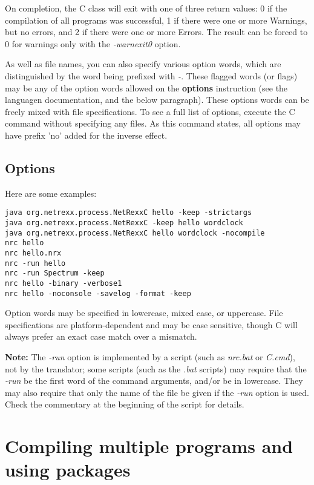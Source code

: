 On completion, the \nr{}C class will exit with one of three return
values: 0 if the compilation of all programs was successful, 1 if there
were one or more Warnings, but no errors, and 2 if there were one or
more Errors. The result can be forced to 0 for warnings only with the
\emph{-warnexit0} option.

As well as file names, you can also specify various option words, which
are distinguished by the word being prefixed with \emph{-}.  These
flagged words (or flags) may be any of the option words allowed
on the \nr{} \textbf{options} instruction (see the \nr{} languagen
documentation, and the below paragraph).  These options words can be freely mixed with file
specifications.  To see a full list of options, execute the \nr{}C
command without specifying any files. As this command states, all options may have prefix 'no' added for the inverse effect.

\subsection{Options}




Here are some examples:
\begin{verbatim}
java org.netrexx.process.NetRexxC hello -keep -strictargs
java org.netrexx.process.NetRexxC -keep hello wordclock
java org.netrexx.process.NetRexxC hello wordclock -nocompile
nrc hello
nrc hello.nrx
nrc -run hello
nrc -run Spectrum -keep
nrc hello -binary -verbose1
nrc hello -noconsole -savelog -format -keep
\end{verbatim}

Option words may be specified in lowercase, mixed case, or uppercase.
File specifications are platform-dependent and may be case sensitive,
though \nr{}C will always prefer an exact case match over a mismatch.

\textbf{Note:} The \emph{-run} option is implemented by a script (such
as \emph{nrc.bat} or \emph{\nr{}C.cmd}), not by the translator; some
scripts (such as the \emph{.bat} scripts) may require that
the \emph{-run} be the first word of the command arguments, and/or be in
lowercase.  They may also require that only the name of the file be
given if the \emph{-run} option is used.  Check the commentary at the
beginning of the script for details.

\section{Compiling multiple programs and using packages}

